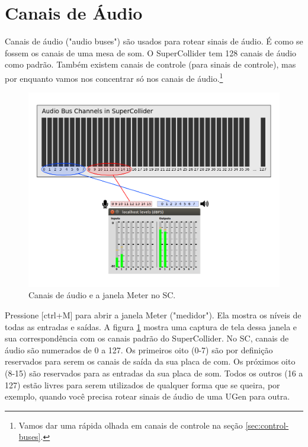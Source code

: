 \section{Canais de Áudio}
\label{sec:audiobus}

Canais de áudio ("audio buses") são usados para rotear sinais de áudio. É como se fossem os canais de uma mesa de som. O SuperCollider tem 128 canais de áudio como padrão. Também existem canais de controle (para sinais de controle), mas por enquanto vamos nos concentrar só nos canais de áudio.\footnote{Vamos dar uma rápida olhada em canais de controle na seção \ref{sec:control-buses}.}

\begin{figure}[h!]
\centerline{
	\includegraphics[scale=0.4]{fig-audio-bus.png}}
\caption{Canais de áudio e a janela Meter no SC.}
\label{fig:audio-bus}
\end{figure}

Pressione [ctrl+M] para abrir a janela Meter ("medidor"). Ela mostra os níveis de todas as entradas e saídas. A figura \ref{fig:audio-bus} mostra uma captura de tela dessa janela e sua correspondência com os canais padrão do SuperCollider. No SC, canais de áudio são numerados de 0 a 127. Os primeiros oito (0-7) são por definição reservados para serem os canais de saída da sua placa de com. Os próximos oito (8-15) são reservados para as entradas da sua placa de som. Todos os outros (16 a 127) estão livres para serem utilizados de qualquer forma que se queira, por exemplo, quando você precisa rotear sinais de áudio de uma UGen para outra.


